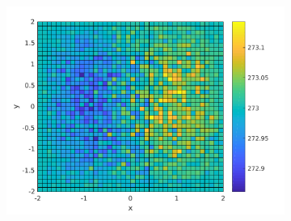 \begin{frame}
\begin{figure}
\begin{subfigure}[t]{0.5\textwidth}
    \end{subfigure}%
    ~ 
    \begin{subfigure}[t]{0.5\textwidth}
        \centering
        \includegraphics[width=0.725\linewidth]{../../results/simulations/1000/solution_2D/solution_2D_sim1000_step01_time250_boundary2.pdf}
    \end{subfigure}
\end{figure}
\end{frame}

